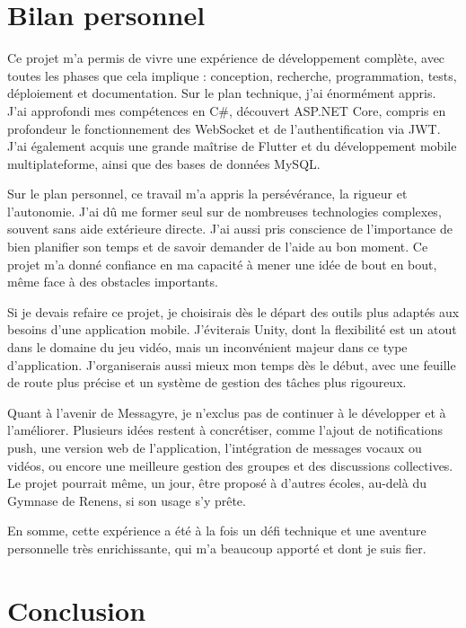 \documentclass[12pt]{report}
\begin{document}
\chapter{Bilan personnel}

Ce projet m’a permis de vivre une expérience de développement complète, avec toutes les phases que cela implique : conception, recherche, programmation, tests, déploiement et documentation. Sur le plan technique, j’ai énormément appris. J’ai approfondi mes compétences en C\#, découvert ASP.NET Core, compris en profondeur le fonctionnement des WebSocket et de l’authentification via JWT. J’ai également acquis une grande maîtrise de Flutter et du développement mobile multiplateforme, ainsi que des bases de données MySQL.

Sur le plan personnel, ce travail m’a appris la persévérance, la rigueur et l’autonomie. J’ai dû me former seul sur de nombreuses technologies complexes, souvent sans aide extérieure directe. J’ai aussi pris conscience de l’importance de bien planifier son temps et de savoir demander de l’aide au bon moment. Ce projet m’a donné confiance en ma capacité à mener une idée de bout en bout, même face à des obstacles importants.

Si je devais refaire ce projet, je choisirais dès le départ des outils plus adaptés aux besoins d’une application mobile. J’éviterais Unity, dont la flexibilité est un atout dans le domaine du jeu vidéo, mais un inconvénient majeur dans ce type d’application. J’organiserais aussi mieux mon temps dès le début, avec une feuille de route plus précise et un système de gestion des tâches plus rigoureux.

Quant à l’avenir de Messagyre, je n’exclus pas de continuer à le développer et à l’améliorer. Plusieurs idées restent à concrétiser, comme l’ajout de notifications push, une version web de l’application, l’intégration de messages vocaux ou vidéos, ou encore une meilleure gestion des groupes et des discussions collectives. Le projet pourrait même, un jour, être proposé à d’autres écoles, au-delà du Gymnase de Renens, si son usage s’y prête.

En somme, cette expérience a été à la fois un défi technique et une aventure personnelle très enrichissante, qui m’a beaucoup apporté et dont je suis fier.


\chapter{Conclusion}
\end{document}
